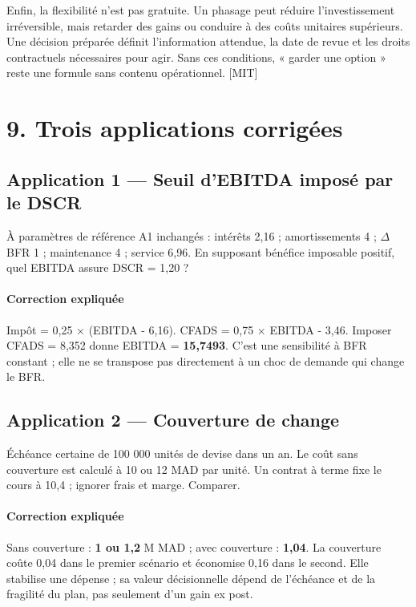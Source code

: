 \documentclass[12pt,a4paper]{article}
\begin{document}
Enfin, la flexibilité n’est pas gratuite. Un phasage peut réduire l’investissement irréversible, mais retarder des gains ou conduire à des coûts unitaires supérieurs. Une décision préparée définit l’information attendue, la date de revue et les droits contractuels nécessaires pour agir. Sans ces conditions, « garder une option » reste une formule sans contenu opérationnel. [MIT]

\section*{9. Trois applications corrigées}

\subsection*{Application 1 --- Seuil d’EBITDA imposé par le DSCR}
À paramètres de référence A1 inchangés : intérêts 2,16 ; amortissements 4 ; $\Delta$BFR 1 ; maintenance 4 ; service 6,96. En supposant bénéfice imposable positif, quel EBITDA assure DSCR = 1,20 ?


\paragraph{Correction expliquée}
Impôt = 0,25 $\times$ (EBITDA - 6,16). CFADS = 0,75 $\times$ EBITDA - 3,46. Imposer CFADS = 8,352 donne EBITDA = \textbf{15,7493}. C’est une sensibilité à BFR constant ; elle ne se transpose pas directement à un choc de demande qui change le BFR.



\subsection*{Application 2 --- Couverture de change}
Échéance certaine de 100 000 unités de devise dans un an. Le coût sans couverture est calculé à 10 ou 12 MAD par unité. Un contrat à terme fixe le cours à 10,4 ; ignorer frais et marge. Comparer.


\paragraph{Correction expliquée}
Sans couverture : \textbf{1 ou 1,2} M MAD ; avec couverture : \textbf{1,04}. La couverture coûte 0,04 dans le premier scénario et économise 0,16 dans le second. Elle stabilise une dépense ; sa valeur décisionnelle dépend de l’échéance et de la fragilité du plan, pas seulement d’un gain ex post.
\end{document}
